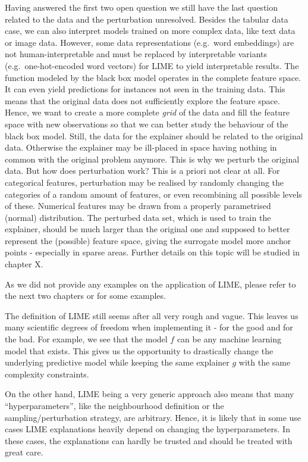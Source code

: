 \documentclass[
]{krantz}
\begin{document}
Having answered the first two open question we still have the last question related to the data and the perturbation unresolved.
Besides the tabular data case, we can also interpret models trained on more complex data, like text data or image data.
However, some data representations (e.g.~word embeddings) are not human-interpretable and must be replaced by interpretable variants (e.g.~one-hot-encoded word vectors) for LIME to yield interpretable results.
The function modeled by the black box model operates in the complete feature space.
It can even yield predictions for instances not seen in the training data.
This means that the original data does not sufficiently explore the feature space.
Hence, we want to create a more complete \emph{grid} of the data and fill the feature space with new observations so that we can better study the behaviour of the black box model.
Still, the data for the explainer should be related to the original data.
Otherwise the explainer may be ill-placed in space having nothing in common with the original problem anymore.
This is why we perturb the original data.
But how does perturbation work?
This is a priori not clear at all.
For categorical features, perturbation may be realised by randomly changing the categories of a random amount of features, or even recombining all possible levels of these.
Numerical features may be drawn from a properly parametrised (normal) distribution.
The perturbed data set, which is used to train the explainer, should be much larger than the original one and supposed to better represent the (possible) feature space, giving the surrogate model more anchor points - especially in sparse areas.
Further details on this topic will be studied in chapter X.

As we did not provide any examples on the application of LIME, please refer to the next two chapters or \citet{molnar2019} for some examples.

The definition of LIME still seems after all very rough and vague.
This leaves us many scientific degrees of freedom when implementing it - for the good and for the bad.
For example, we see that the model \(f\) can be any machine learning model that exists.
This gives us the opportunity to drastically change the underlying predictive model while keeping the same explainer \(g\) with the same complexity constraints.

On the other hand, LIME being a very generic approach also means that many ``hyperparameters'', like the neighbourhood definition or the sampling/perturbation strategy, are arbitrary.
Hence, it is likely that in some use cases LIME explanations heavily depend on changing the hyperparameters.
In these cases, the explanations can hardly be trusted and should be treated with great care.
\end{document}
